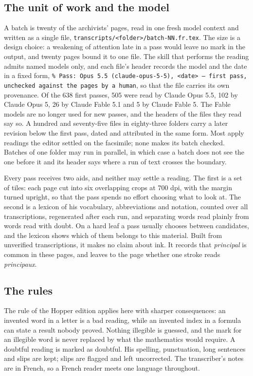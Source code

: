 \documentclass[11pt]{article}
\begin{document}
\subsection{The unit of work and the model}

A batch is twenty of the archivists' pages, read in one fresh model context and written as a single file, \texttt{transcripts/<folder>/batch-NN.fr.tex}. The size is a design choice: a weakening of attention late in a pass would leave no mark in the output, and twenty pages bound it to one file. The skill that performs the reading admits named models only, and each file's header records the model and the date in a fixed form, \texttt{\% Pass: Opus 5.5 (claude-opus-5-5), <date> --- first pass, unchecked against the pages by a human}, so that the file carries its own provenance. Of the 638 first passes, 505 were read by Claude Opus 5.5, 102 by Claude Opus 5, 26 by Claude Fable 5.1 and 5 by Claude Fable 5. The Fable models are no longer used for new passes, and the headers of the files they read say so. A hundred and seventy-five files in eighty-three folders carry a later revision below the first pass, dated and attributed in the same form. Most apply readings the editor settled on the facsimile; none makes its batch checked. Batches of one folder may run in parallel, in which case a batch does not see the one before it and its header says where a run of text crosses the boundary.

Every pass receives two aids, and neither may settle a reading. The first is a set of tiles: each page cut into six overlapping crops at 700 dpi, with the margin turned upright, so that the pass spends no effort choosing what to look at. The second is a lexicon of his vocabulary, abbreviations and notation, counted over all transcriptions, regenerated after each run, and separating words read plainly from words read with doubt. On a hard leaf a pass usually chooses between candidates, and the lexicon shows which of them belongs to this material. Built from unverified transcriptions, it makes no claim about ink. It records that \emph{principal} is common in these pages, and leaves to the page whether one stroke reads \emph{principaux}.

\subsection{The rules}

The rule of the Hopper edition applies here with sharper consequences: an invented word in a letter is a bad reading, while an invented index in a formula can state a result nobody proved. Nothing illegible is guessed, and the mark for an illegible word is never replaced by what the mathematics would require. A doubtful reading is marked as doubtful. His spelling, punctuation, long sentences and slips are kept; slips are flagged and left uncorrected. The transcriber's notes are in French, so a French reader meets one language throughout.
\end{document}

